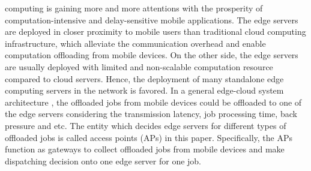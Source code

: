 
 computing is gaining more and more attentions with the prosperity of computation-intensive and delay-sensitive mobile applications. %
The edge servers are deployed in closer proximity to mobile users than traditional cloud computing infrastructure, which alleviate the communication overhead and enable computation offloading from mobile devices.
On the other side, the edge servers are usually deployed with limited and non-scalable computation resource compared to cloud servers.
Hence, the deployment of many standalone edge computing servers in the network is favored.
In a general edge-cloud system architecture \cite{MEC-SURVEY}, the offloaded jobs from mobile devices could be offloaded to one of the edge servers considering the transmission latency, job processing time, back pressure and etc.
The entity which decides edge servers for different types of offloaded jobs is called access points (APs) in this paper.
Specifically, the APs function as gateways to collect offloaded jobs from mobile devices and make dispatching decision onto one edge server for one job.


